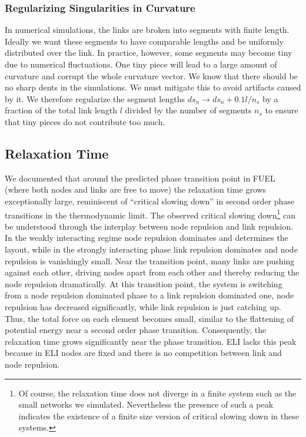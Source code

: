 \documentclass[linenumbers,endfloats,nofootinbib,preprint,floatfix,titlepage,superscriptaddress]{revtex4-1} %
\begin{document}
\subsubsection{Regularizing Singularities in Curvature}
In numerical simulations, the links are broken into segments with finite length. 
Ideally we want these segments to have comparable lengths and be uniformly distributed over the link. 
In practice, however, some segments may become tiny due to numerical fluctuations. 
One tiny piece will lead to a large amount of curvature and corrupt the whole curvature vector. 
We know that there should be no sharp dents in the simulations. %
We must mitigate this to avoid artifacts caused by it. 
We therefore regularize the segment lengths $ds_n\to ds_n+ 0.1 l/n_s$ by a fraction of the total link length $l$ divided by the number of segments $n_s$ to ensure that tiny pieces do not contribute too much. 

\subsection{Relaxation Time \label{ap:relax}}
We documented that around the predicted phase transition point in FUEL (where both nodes and links are free to move) the relaxation time grows exceptionally large, reminiscent of ``critical slowing down'' in second order phase transitions in the thermodynamic limit.  
The observed critical slowing down\footnote{Of course, the relaxation time does not diverge in a finite system such as the small networks we simulated. 
Nevertheless the presence of such a peak indicates the existence of a finite size version of critical slowing down in these systems.} 
can be understood through the interplay between node repulsion and link repulsion. 
In the weakly interacting regime node repulsion dominates and determines the layout, while in the strongly interacting phase link repulsion dominates and node repulsion is vanishingly small. 
Near the transition point, many links are pushing against each other, driving nodes apart from each other and thereby reducing the node repulsion dramatically. 
At this transition point, the system is switching from a node repulsion dominated phase to a link repulsion dominated one, node repulsion has decreased significantly, while link repulsion is just catching up. 
Thus, the total force on each element becomes small, similar to the flattening of potential energy near a second order phase transition.
Consequently, the relaxation time grows significantly near the phase transition. 
ELI lacks this peak %
because in ELI nodes are fixed and there is no competition between link and node repulsion. 
\end{document}
